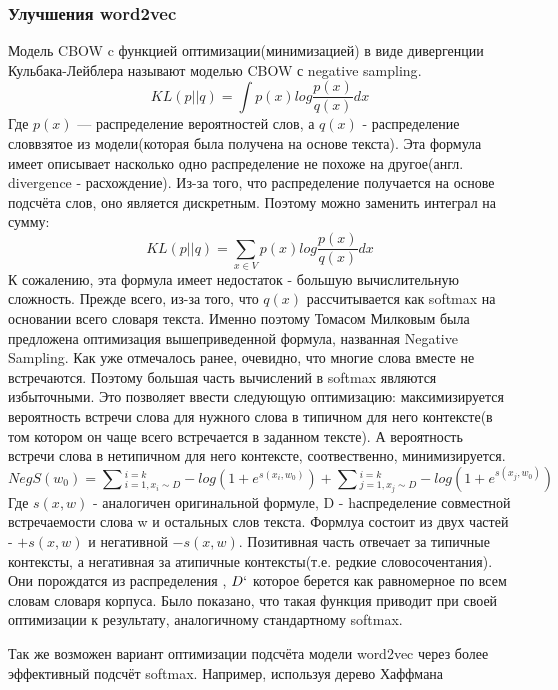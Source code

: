 \subsubsection{Улучшения word2vec}
Модель CBOW c функцией оптимизации(минимизацией) в виде  дивергенции Кульбака-Лейблера называют моделью CBOW с negative sampling\cite{Book29}.
\begin{equation}
KL(p||q) = \int p(x)log\frac{p(x)}{q(x)}dx
\end{equation}
Где $p(x)$  — распределение вероятностей слов, а $q(x)$ - распределение словвзятое из модели(которая была получена на основе текста). Эта формула имеет описывает насколько одно распределение не похоже на другое(англ. divergence  - расхождение). Из-за того, что распределение получается на основе подсчёта слов, оно является дискретным. Поэтому  можно заменить интеграл на сумму:
\begin{equation}
KL(p||q) = \sum_{x \in V} p(x)log\frac{p(x)}{q(x)}dx
\end{equation}
К сожалению, эта формула имеет недостаток - большую вычислительную сложность. Прежде всего, из-за того, что $q(x)$ рассчитывается как softmax на основании всего словаря текста.
Именно поэтому Томасом Милковым\cite{Book29} была предложена оптимизация вышеприведенной формула, названная Negative Sampling. Как уже отмечалось ранее, очевидно, что многие слова вместе не встречаются. Поэтому большая часть вычислений в softmax являются избыточными. Это позволяет ввести следующую оптимизацию: максимизируется вероятность встречи слова для нужного слова в типичном для него контексте(в том котором он чаще всего встречается в заданном тексте). А вероятность встречи слова в нетипичном для него контексте, соотвественно, минимизируется.
\begin{equation}
NegS(w_0) = \sum{_{i=1, x_i \sim D}^{i=k} -log(1 + e^{s(x_i, w_0)})}  + 
\sum{_{j=1, x_j \sim D}^{i=k} -log(1 + e^{s(x_j, w_0)})}
\end{equation}
Где $s(x,w)$ - аналогичен оригинальной формуле,  D - hаспределение совместной встречаемости слова w и остальных слов текста. Формлуа состоит из двух частей - $+s(x,w)$ и негативной $-s(x,w)$. Позитивная часть отвечает за типичные контексты, а негативная за атипичные контексты(т.е. редкие словосочентания).
Они порождатся из распределения , $D`$ которое берется как равномерное по всем словам словаря корпуса. Было показано, что такая функция приводит при своей оптимизации к результату, аналогичному стандартному softmax\cite{Book29}.


Так же возможен вариант  оптимизации подсчёта модели word2vec через более эффективный подсчёт softmax. Например, используя дерево Хаффмана\cite{Book30}

